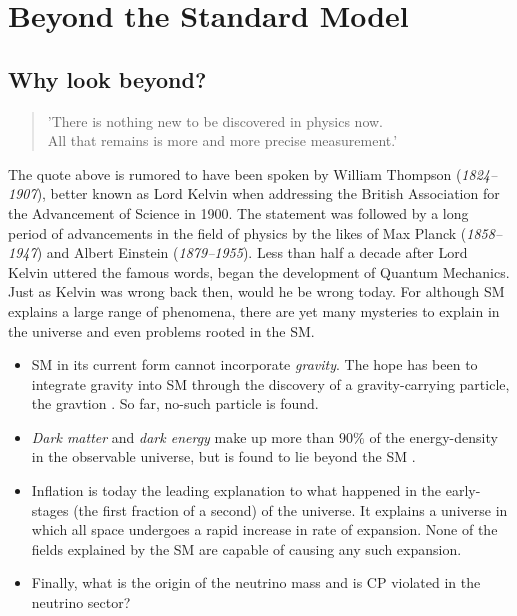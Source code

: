 \section{Beyond the Standard Model}
\subsection{Why look beyond?}
\begin{center}
    \hyphenblockcquote{UKenglish}{Kelvin}{
        'There is nothing new to be discovered in physics now.\\
        All that remains is more and more precise measurement.'
        }
\end{center}
The quote above is rumored to have been spoken by William Thompson (\emph{1824–1907}), better
known as Lord Kelvin when addressing the British Association for the Advancement
of Science in 1900. The statement was followed by a long period of advancements in the
field of physics by the likes of Max Planck (\emph{1858–1947}) and 
Albert Einstein (\emph{1879–1955}). Less than half a decade after Lord Kelvin
uttered the famous words, began the development of Quantum Mechanics. 
Just as Kelvin was wrong back then, would he be wrong today. For although \ac{SM} explains 
a large range of phenomena, there are yet many mysteries to explain in the universe and even 
problems rooted in the \ac{SM}. 
\begin{itemize}
    \item \ac{SM} in its current form cannot incorporate \emph{gravity}. 
    The hope has been to integrate gravity into \ac{SM} through the discovery of a gravity-carrying particle, 
    the gravtion \cite{Graviton}. So far, no-such particle is found.
    \item \emph{Dark matter} and \emph{dark energy} make up more than $90\%$ of the energy-density in the 
    observable universe, but is found to lie beyond the \ac{SM} \cite{DarkME}.
    \item Inflation is today the leading explanation to what happened in the early-stages
    (the first fraction of a second) of the universe. It explains a universe in which all space
    undergoes a rapid increase in rate of expansion. None of the fields explained by the \ac{SM} are 
    capable of causing any such expansion.
    \item Finally, what is the origin of the neutrino 
    mass and is \ac{CP} violated in the neutrino sector? 
\end{itemize}
